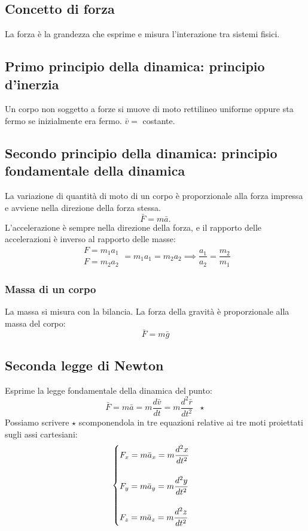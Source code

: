 \documentclass[../../main.tex]{subfiles}
\begin{document}
\subsection{Concetto di forza}
La forza è la grandezza che esprime e misura l'interazione tra sistemi fisici.
\subsection{Primo principio della dinamica: principio d'inerzia}
Un corpo non soggetto a forze si muove di moto rettilineo uniforme oppure sta fermo se inizialmente era fermo. $\bar v =$ costante.
\subsection{Secondo principio della dinamica: principio fondamentale della dinamica}
La variazione di quantità di moto di un corpo è proporzionale alla forza impressa e avviene nella direzione della forza stessa. \[\bar F = m \bar a.\]
L'accelerazione è sempre nella direzione della forza, e il rapporto delle accelerazioni è inverso al rapporto delle masse:
\[
    \begin{array}{lr}
        F = m_1 a_1 \\
        F = m_2 a_2
    \end{array} = m_1 a_1 = m_2 a_2 \implies \frac{a_1}{a_2} = \frac{m_2}{m_1}
\]

\subsubsection{Massa di un corpo}
La massa si misura con la bilancia. La forza della gravità è proporzionale alla massa del corpo:
\[
    \bar F = m \bar g
\]
\subsection{Seconda legge di Newton}
Esprime la legge fondamentale della dinamica del punto:
\[
    \bar F = m\bar{a} = m\dfrac{d\bar v}{dt} = m\dfrac{d^2\bar{r}}{dt^2} \ \ \ \star
\]
Possiamo scrivere $\star$ scomponendola in tre equazioni relative ai tre moti proiettati sugli assi cartesiani:
\[
    \begin{cases}
        F_x = m\bar{a}_x = m\dfrac{d^2x}{dt^2} \\
        \vspace{1px}                           \\
        F_y = m\bar{a}_y = m\dfrac{d^2y}{dt^2} \\
        \vspace{1px}                           \\
        F_z = m\bar{a}_z = m\dfrac{d^2z}{dt^2}
    \end{cases}
\]
\end{document}
